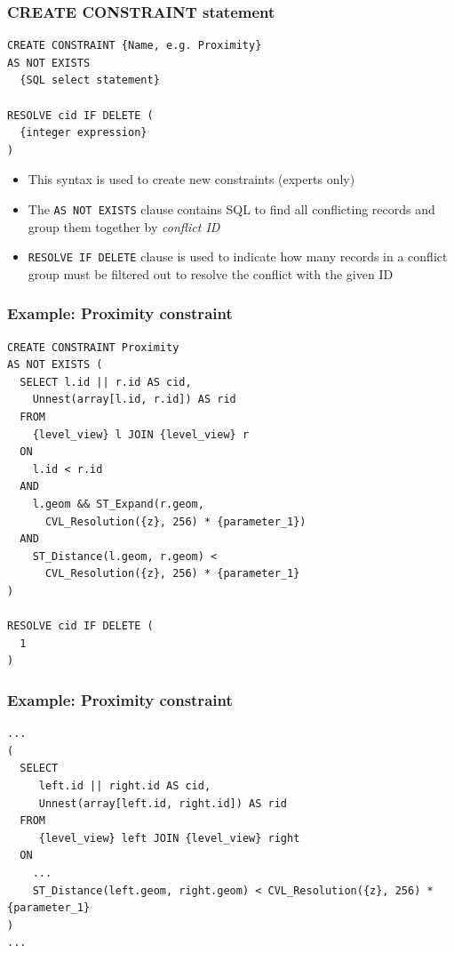 \documentclass{beamer}
\begin{document}
\begin{frame}[fragile]
\frametitle{CREATE CONSTRAINT statement}
\begin{lstlisting}
CREATE CONSTRAINT {Name, e.g. Proximity}
AS NOT EXISTS
  {SQL select statement}
  
RESOLVE cid IF DELETE (
  {integer expression}
)
\end{lstlisting}

\begin{itemize}
\item This syntax is used to create new constraints (experts only)
\item The \texttt{AS NOT EXISTS} clause contains SQL to find all conflicting records and group them together by \emph{conflict ID}
\item \texttt{RESOLVE IF DELETE} clause is used to indicate how many records in a conflict group must be filtered out to resolve the conflict with the given ID
\end{itemize}
\end{frame}

\begin{frame}[fragile]
\frametitle{Example: Proximity constraint}
\begin{lstlisting}
CREATE CONSTRAINT Proximity
AS NOT EXISTS (
  SELECT l.id || r.id AS cid, 
    Unnest(array[l.id, r.id]) AS rid
  FROM
    {level_view} l JOIN {level_view} r
  ON
    l.id < r.id
  AND
    l.geom && ST_Expand(r.geom, 
      CVL_Resolution({z}, 256) * {parameter_1})
  AND
    ST_Distance(l.geom, r.geom) < 
      CVL_Resolution({z}, 256) * {parameter_1}
)

RESOLVE cid IF DELETE (
  1
)
\end{lstlisting}
\end{frame}

\begin{frame}[fragile]
\frametitle{Example: Proximity constraint}
\begin{center}
\end{center}
\begin{lstlisting}
...
(
  SELECT
     left.id || right.id AS cid, 
     Unnest(array[left.id, right.id]) AS rid
  FROM 
     {level_view} left JOIN {level_view} right
  ON 
    ...
    ST_Distance(left.geom, right.geom) < CVL_Resolution({z}, 256) * {parameter_1}
)
...
\end{lstlisting}
\end{frame}
\end{document}
